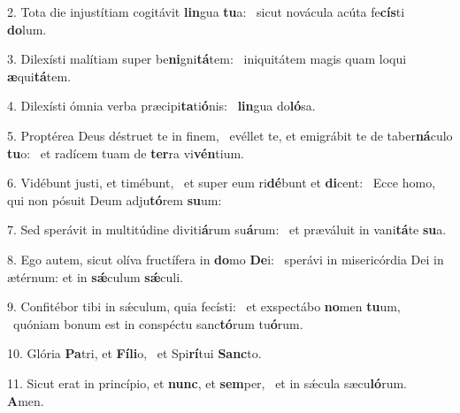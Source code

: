 2. Tota die injustítiam cogitávit \textbf{lin}gua \textbf{tu}a: \ast\  sicut novácula acúta fe\textbf{cís}ti \textbf{do}lum.\

3. Dilexísti malítiam super be\textbf{ni}gni\textbf{tá}tem: \ast\  iniquitátem magis quam loqui \textbf{æ}qui\textbf{tá}tem.\

4. Dilexísti ómnia verba præcipi\textbf{ta}ti\textbf{ó}nis: \ast\  \textbf{lin}gua do\textbf{ló}sa.\

5. Proptérea Deus déstruet te in finem, \dag\  evéllet te, et emigrábit te de taber\textbf{ná}culo \textbf{tu}o: \ast\  et radícem tuam de \textbf{ter}ra vi\textbf{vén}tium.\

6. Vidébunt justi, et timébunt, \dag\  et super eum ri\textbf{dé}bunt et \textbf{di}cent: \ast\  Ecce homo, qui non pósuit Deum adju\textbf{tó}rem \textbf{su}um:\

7. Sed sperávit in multitúdine diviti\textbf{á}rum su\textbf{á}rum: \ast\  et præváluit in vani\textbf{tá}te \textbf{su}a.\

8. Ego autem, sicut olíva fructífera in \textbf{do}mo \textbf{De}i: \ast\  sperávi in misericórdia Dei in ætérnum: et in \textbf{sǽ}culum \textbf{sǽ}culi.\

9. Confitébor tibi in sǽculum, quia fecísti: \dag\  et exspectábo \textbf{no}men \textbf{tu}um, \ast\  quóniam bonum est in conspéctu sanc\textbf{tó}rum tu\textbf{ó}rum.\

10. Glória \textbf{Pa}tri, et \textbf{Fí}\textbf{li}o, \ast\  et Spi\textbf{rí}tui \textbf{Sanc}to.\

11. Sicut erat in princípio, et \textbf{nunc}, et \textbf{sem}per, \ast\  et in sǽcula sæcu\textbf{ló}rum. \textbf{A}men.\

